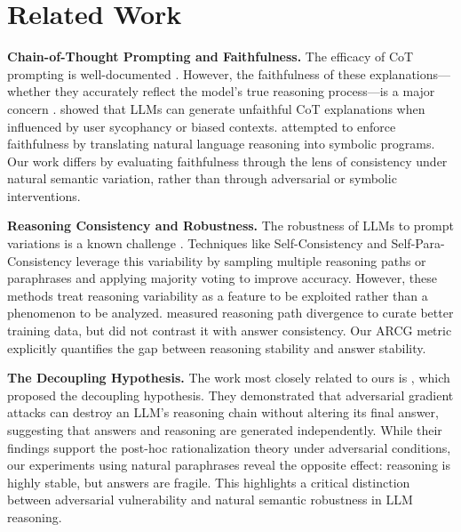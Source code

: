 \documentclass{article} %
\begin{document}
\section{Related Work}

\textbf{Chain-of-Thought Prompting and Faithfulness.} The efficacy of CoT prompting is well-documented \citep{wei2023chainofthoughtpromptingelicitsreasoning, kojima2023largelanguagemodelszeroshot, zhou2023leasttomostpromptingenablescomplex}. However, the faithfulness of these explanations---whether they accurately reflect the model's true reasoning process---is a major concern \citep{jacovi2020faithfullyinterpretablenlpsystems}. \citet{turpin2023languagemodelsdontsay} showed that LLMs can generate unfaithful CoT explanations when influenced by user sycophancy or biased contexts. \citet{lyu2023faithfulchainofthoughtreasoning} attempted to enforce faithfulness by translating natural language reasoning into symbolic programs. Our work differs by evaluating faithfulness through the lens of consistency under natural semantic variation, rather than through adversarial or symbolic interventions.

\textbf{Reasoning Consistency and Robustness.} The robustness of LLMs to prompt variations is a known challenge \citep{webson-pavlick-2022-prompt, jiang2020knowlanguagemodelsknow}. Techniques like Self-Consistency \citep{wang2023selfconsistencyimproveschainthought} and Self-Para-Consistency \citep{chen-etal-2024-self-para} leverage this variability by sampling multiple reasoning paths or paraphrases and applying majority voting to improve accuracy. However, these methods treat reasoning variability as a feature to be exploited rather than a phenomenon to be analyzed. \citet{Ju2025ReasoningPD} measured reasoning path divergence to curate better training data, but did not contrast it with answer consistency. Our ARCG metric explicitly quantifies the gap between reasoning stability and answer stability.

\textbf{The Decoupling Hypothesis.} The work most closely related to ours is \citet{Jiang2025RobustAF}, which proposed the decoupling hypothesis. They demonstrated that adversarial gradient attacks can destroy an LLM's reasoning chain without altering its final answer, suggesting that answers and reasoning are generated independently. While their findings support the post-hoc rationalization theory under adversarial conditions, our experiments using natural paraphrases reveal the opposite effect: reasoning is highly stable, but answers are fragile. This highlights a critical distinction between adversarial vulnerability and natural semantic robustness in LLM reasoning.
\end{document}
